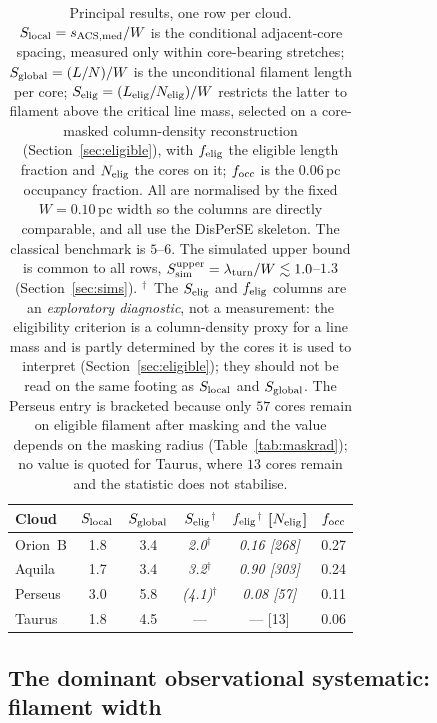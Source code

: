 \documentclass[usenatbib,twoside,twocolumn]{mnras}
\begin{document}
\begin{table}
\caption{Principal results, one row per cloud. $S_{\rm local}=s_{\rm ACS,med}/W$ is the conditional adjacent-core spacing, measured only within core-bearing stretches; $S_{\rm global}=(L/N)/W$ is the unconditional filament length per core; $S_{\rm elig}=(L_{\rm elig}/N_{\rm elig})/W$ restricts the latter to filament above the critical line mass, selected on a core-masked column-density reconstruction (Section~\ref{sec:eligible}), with $f_{\rm elig}$ the eligible length fraction and $N_{\rm elig}$ the cores on it; $f_{\rm occ}$ is the $0.06$\,pc occupancy fraction. All are normalised by the fixed $W=0.10$\,pc width so the columns are directly comparable, and all use the DisPerSE skeleton. The classical benchmark is $5$--$6$. The simulated upper bound is common to all rows, $S_{\rm sim}^{\rm upper}=\lambda_{\rm turn}/W\lesssim1.0$--$1.3$ (Section~\ref{sec:sims}). $^{\dagger}$~The $S_{\rm elig}$ and $f_{\rm elig}$ columns are an \emph{exploratory diagnostic}, not a measurement: the eligibility criterion is a column-density proxy for a line mass and is partly determined by the cores it is used to interpret (Section~\ref{sec:eligible}); they should not be read on the same footing as $S_{\rm local}$ and $S_{\rm global}$. The Perseus entry is bracketed because only $57$ cores remain on eligible filament after masking and the value depends on the masking radius (Table~\ref{tab:maskrad}); no value is quoted for Taurus, where $13$ cores remain and the statistic does not stabilise.}
\label{tab:principal}
\footnotesize
\setlength{\tabcolsep}{4pt}
\begin{tabular}{lccccc}
\toprule
Cloud & $S_{\rm local}$ & $S_{\rm global}$ & \emph{$S_{\rm elig}$}$^{\dagger}$ & \emph{$f_{\rm elig}$}$^{\dagger}$ [$N_{\rm elig}$] & $f_{\rm occ}$ \\
\midrule
Orion~B & 1.8 & 3.4 & \emph{2.0}$^{\dagger}$ & \emph{0.16 [268]} & 0.27 \\
Aquila  & 1.7 & 3.4 & \emph{3.2}$^{\dagger}$ & \emph{0.90 [303]} & 0.24 \\
Perseus & 3.0 & 5.8 & \emph{(4.1)}$^{\dagger}$ & \emph{0.08 [57]} & 0.11 \\
Taurus  & 1.8 & 4.5 & ---    & --- [13]   & 0.06 \\
\bottomrule
\end{tabular}
\end{table}



\subsection{The dominant observational systematic: filament width}
\label{sec:width}
\end{document}
